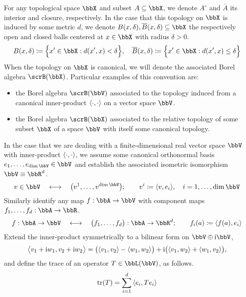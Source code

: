 For any topological space $\stateSpace$ and subset $A \subseteq \stateSpace$, we denote $A^\circ$ and $\overline A$ its interior and closure, respectively.
In the case that this topology on $\stateSpace$ is induced by some metric $d$, we denote $\ball{\stateVar}{\delta}, \closedBall{\stateVar}{\delta} \subseteq \stateSpace$ the respectively open and closed balls centered at $\stateVar \in \stateSpace$ with radius $\delta > 0$.
\begin{equation*}
  \ball{\stateVar}{\delta} \defeq \Big\{ \stateVar' \in \stateSpace : d(\stateVar', \stateVar) < \delta \Big\}, \quad
  \closedBall{\stateVar}{\delta} \defeq \Big\{ \stateVar' \in \stateSpace : d(\stateVar', \stateVar) \leq \delta \Big\}
\end{equation*}
When the topology on $\stateSpace$ is canonical, we will denote the associated Borel algebra $\scrB(\stateSpace)$.
Particular examples of this convention are:
\begin{itemize}
  \item
    the Borel algebra $\scrB(\vecSpace)$ associated to the topology induced from a canonical inner-product ${\langle \cdot , \cdot \rangle}$ on a vector space $\vecSpace$.
  \item
    the Borel algebra $\scrB(\stateSpace)$ associated to the relative topology of some subset $\stateSpace$ of a space $\vecSpace$ with itself some canonical topology.
\end{itemize}
In the case that we are dealing with a finite-dimensional real vector space $\vecSpace$ with inner-product ${\langle \cdot , \cdot \rangle}$, we assume some canonical orthonormal basis $\basisVec_1, \ldots, \basisVec_{\operatorname{dim}\vecSpace} \in \vecSpace$ and establish the associated isometric isomorphism $\vecSpace \equiv \bbR^d$.
\begin{equation*}
  \vecVar \in \vecSpace \quad\longleftrightarrow\quad \big(\vecVar^1, \ldots, \vecVar^{\operatorname{dim}\vecSpace}\big); \qquad \vecVar^i \defeq \prj{\vecVar}{\basisVec_i}, \quad i = 1, \ldots, \operatorname{dim}\vecSpace
\end{equation*}
Similarly identify any map $f: \bbA \rightarrow \vecSpace$ with component maps $f_1, \ldots, f_d: \bbA \rightarrow \bbR$.
\begin{equation*}
  f: \bbA \rightarrow \vecSpace \quad\longleftrightarrow\quad \big(f_1,\ldots, f_d\big): \bbA \rightarrow \bbR^d; \qquad f_i(a) \defeq \prj{f(a)}{\basisVec_i}
\end{equation*}
Extend the inner-product symmetrically to a bilinear form on $\vecSpace\oplus\im\vecSpace$,
\begin{equation*}
  {\big\langle v_1+{\rm i}w_1 , v_2 + {\rm i}w_2 \big\rangle} = \big({\langle v_1 , v_2 \rangle} - {\langle w_1 , w_2 \rangle}\big) + {\rm i}\big({\langle v_1 , w_2 \rangle} + {\langle w_1 , v_2 \rangle}\big),
\end{equation*}
and define the trace of an operator $T \in \bbL(\vecSpace)$, as follows.
\begin{equation*}
  \operatorname{tr}(T) = \sum_{i=1}^d {\langle e_i , Te_i \rangle}
\end{equation*}

